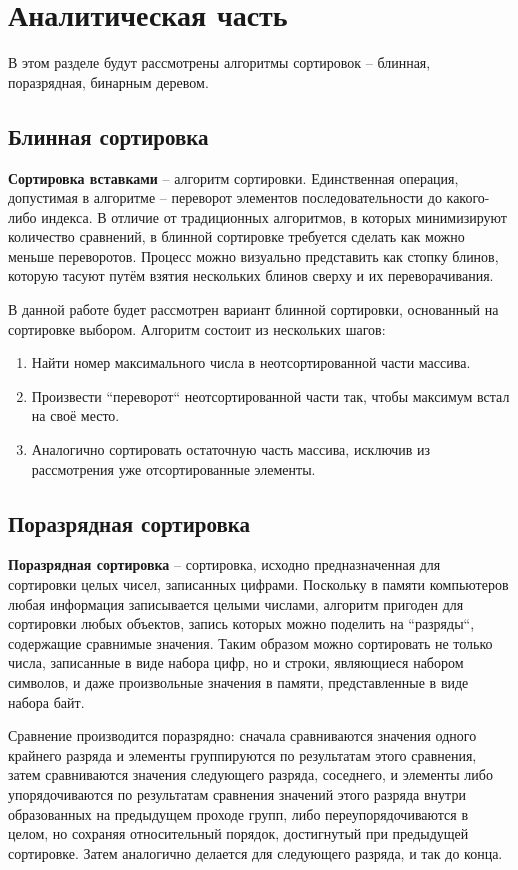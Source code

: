 \chapter{Аналитическая часть}
В этом разделе будут рассмотрены алгоритмы сортировок -- блинная, поразрядная, бинарным деревом.

\section{Блинная сортировка}
\textbf{Сортировка вставками} \cite{pancake-sort} -- алгоритм сортировки.
Единственная операция, допустимая в алгоритме -- переворот элементов последовательности до какого-либо индекса. В отличие от традиционных алгоритмов, в которых минимизируют количество сравнений, в блинной сортировке требуется сделать как можно меньше переворотов. Процесс можно визуально представить как стопку блинов, которую тасуют путём взятия нескольких блинов сверху и их переворачивания.

В данной работе будет рассмотрен вариант блинной сортировки, основанный на сортировке выбором.
Алгоритм состоит из нескольких шагов:
\begin{enumerate}
	\item Найти номер максимального числа в неотсортированной части массива.
	\item Произвести ``переворот`` неотсортированной части так, чтобы максимум встал на своё место.
	\item Аналогично сортировать остаточную часть массива, исключив из рассмотрения уже отсортированные элементы.
\end{enumerate}

\section{Поразрядная сортировка}
\textbf{Поразрядная сортировка} \cite{radix-sort}  -- сортировка, исходно предназначенная для сортировки целых чисел, записанных цифрами. 
Поскольку в памяти компьютеров любая информация записывается целыми числами, алгоритм пригоден для сортировки любых объектов, запись которых можно поделить на ``разряды``, содержащие сравнимые значения. 
Таким образом можно сортировать не только числа, записанные в виде набора цифр, но и строки, являющиеся набором символов, и даже произвольные значения в памяти, представленные в виде набора байт.


Сравнение производится поразрядно: сначала сравниваются значения одного крайнего разряда и элементы группируются по результатам этого сравнения, затем сравниваются значения следующего разряда, соседнего, и элементы либо упорядочиваются по результатам сравнения значений этого разряда внутри образованных на предыдущем проходе групп, либо переупорядочиваются в целом, но сохраняя относительный порядок, достигнутый при предыдущей сортировке. Затем аналогично делается для следующего разряда, и так до конца.


